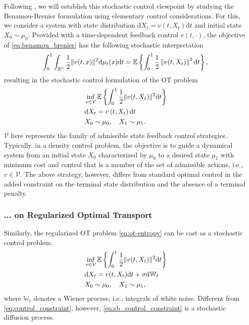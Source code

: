 Following \citet{chen2021optimal, chen2021stochastic}, we will establish this stochastic control viewpoint by studying the Benamou-Brenier formulation using elementary control considerations.
For this, we consider a system with state distribution $\mathrm{d}X_t=v\left(t, X_t\right)\mathrm{d}t$ and initial state $X_0 \sim \mu_0$. Provided with a time-dependent feedback control $v(t, \cdot)$, the objective of \eqref{eq:benamou_brenier} has the following stochastic interpretation
\begin{equation*}
	\int_0^1 \int_{\mathbb{R}^n} \frac{1}{2}\lVert v(t, x)\rVert^2 \mathrm{d}\mu_t(x) \mathrm{d}t = \mathbb{E}\left\{\int_0^1 \frac{1}{2}\left\|v(t, X_t)\right\|^2 \mathrm{d}t\right\},
\end{equation*}
resulting in the stochastic control formulation of the \acrshort{OT} problem 
\begin{align}
& \inf _{v \in \mathcal{V}} \mathbb{E}\left\{\int_0^1 \frac{1}{2}\lVert v(t, X_t)\rVert^2 \mathrm{d}t\right\} \\
\label{eq:control_constraint} & \mathrm{d}X_t=v\left(t, X_t\right)\mathrm{d}t  \\
\nonumber & X_0 \sim \mu_0, \quad X_1 \sim \mu_1.
\end{align}
$\mathcal{V}$ here represents the family of admissible state feedback control strategies.
Typically, in a density control problem, the objective is to guide a dynamical system from an initial state $X_0$ characterized by $\mu_0$ to a desired state $\mu_1$ with minimum cost and control that is a member of the set of admissible actions, i.e., $v \in \mathcal{V}$. 
The above strategy, however, differs from standard optimal control in the added constraint on the terminal state distribution and the absence of a terminal penalty.


\subsubsection*{... on Regularized Optimal Transport}

Similarly, the regularized \acrshort{OT} problem \eqref{eq:ot-entropy} can be cast as a stochastic control problem.
\begin{align}
\label{eq:sb_control}
& \inf _{v \in \mathcal{V}} \mathbb{E}\left\{\int_0^1 \frac{1}{2}\lVert v(t, X_t)\rVert^2 \mathrm{d} t\right\}\\
\label{eq:sb_control_constraint}
& \mathrm{d} X_t = v(t, X_t) \mathrm{d} t + \sigma \mathrm{d} \mathbb{W}_t \\
\nonumber & X_0 \sim \mu_0, \quad X_1 \sim \mu_1,
\end{align}
where $\mathbb{W}_t $ denotes a Wiener process, i.e., integrals of white noise. 
Different from \eqref{eq:control_constraint}, however, \eqref{eq:sb_control_constraint} is a stochastic diffusion process.

